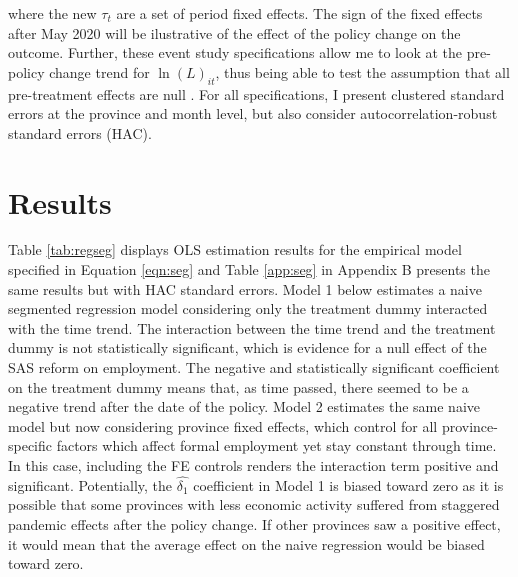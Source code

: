 \documentclass[11pt,a4paper]{article}\usepackage[]{graphicx}\usepackage[]{xcolor}
\begin{document}
where the new $\tau_t$ are a set of period fixed effects. The sign of the fixed effects after May 2020 will be ilustrative of the effect of the policy change on the outcome. Further, these event study specifications allow me to look at the pre-policy change trend for $\ln(L)_{it}$, thus being able to test the assumption that all pre-treatment effects are null \parencite{HuntingtonKlein.2021}. For all specifications, I present clustered standard errors at the province and month level, but also consider autocorrelation-robust standard errors (HAC). 

\section{Results}
Table \ref{tab:regseg} displays OLS estimation results for the empirical model specified in Equation \ref{eqn:seg} and Table \ref{app:seg} in Appendix B presents the same results but with HAC standard errors. Model 1 below estimates a naive segmented regression model considering only the treatment dummy interacted with the time trend. The interaction between the time trend and the treatment dummy is not statistically significant, which is evidence for a null effect of the SAS reform on employment. The negative and statistically significant coefficient on the treatment dummy means that, as time passed, there seemed to be a negative trend after the date of the policy. Model 2 estimates the same naive model but now considering province fixed effects, which control for all province-specific factors which affect formal employment yet stay constant through time. In this case, including the FE controls renders the interaction term positive and significant. Potentially, the $\hat{\delta_1}$ coefficient in Model 1 is biased toward zero as it is possible that some provinces with less economic activity suffered from staggered pandemic effects after the policy change. If other provinces saw a positive effect, it would mean that the average effect on the naive regression would be biased toward zero. 
\end{document}
